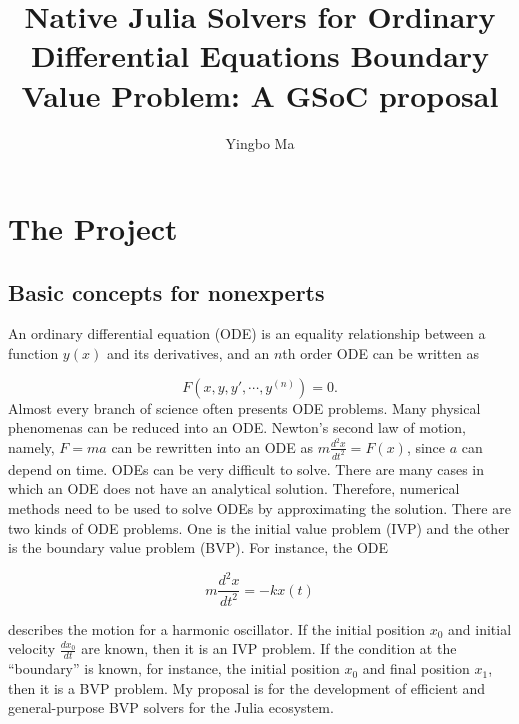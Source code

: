 \documentclass[a4paper,11pt,onecolumn]{article}
\author{Yingbo Ma}
\title{Native Julia Solvers for Ordinary Differential Equations Boundary Value Problem: A GSoC proposal}
\begin{document}
\maketitle
\tableofcontents



\section{The Project} %
\label{sec:the_project}

\subsection{Basic concepts for nonexperts} %
\label{sub:basic_concepts_for_nonexperts}
An ordinary differential equation (ODE) is an equality relationship between a function $y(x)$
and its derivatives, and an $n$th order ODE can be written as

\[F(x, y, y', \cdots, y^{(n)}) = 0.\]
Almost every branch of science often presents ODE problems. Many physical phenomenas can be reduced
into an ODE. Newton's second law of motion, namely, $F=ma$ can be rewritten into an ODE as $m\frac{
d^2x}{dt^2}=F(x)$, since $a$ can depend on time. ODEs can be very difficult to solve. There are
many cases in which an ODE does not have an analytical solution. Therefore, numerical methods need
to be used to solve ODEs by approximating the solution. There are two kinds of ODE problems. One 
is the initial value problem (IVP) and the other is the boundary value problem (BVP). For instance, the ODE

\[m\frac{d^2x}{dt^2} = -kx(t)\]

describes the motion for a harmonic oscillator. If the initial position $x_0$ and initial velocity
$\frac{dx_0}{dt}$ are known, then it is an IVP problem. If the condition at the ``boundary'' is 
known, for instance, the initial position $x_0$ and final position $x_1$, then it is a BVP problem. My
proposal is for the development of efficient and general-purpose BVP solvers for the Julia
ecosystem.
\end{document}
